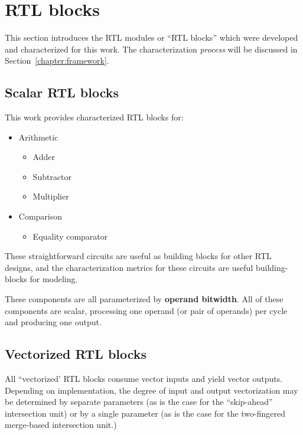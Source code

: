 \chapter{RTL blocks}
\label{chapter:rtl}

This section introduces the RTL modules or ``RTL blocks'' which were developed and characterized for this work. The characterization \textit{process} will be discussed in Section~\ref{chapter:framework}.

\section{Scalar RTL blocks}

This work provides characterized RTL blocks for:

\begin{itemize}
    \item Arithmetic

    \begin{itemize}
        \item Adder
        \item Subtractor
        \item Multiplier
    \end{itemize}
    
    \item Comparison

    \begin{itemize}
        \item Equality comparator
    \end{itemize}
\end{itemize}

These straightforward circuits are useful as building blocks for other RTL designs, and the characterization metrics for these circuits are useful building-blocks for modeling.

These components are all parameterized by \textbf{operand bitwidth}. All of these components are scalar, processing one operand (or pair of operands) per cycle and producing one output.

\section{Vectorized RTL blocks}

All ``vectorized' RTL blocks consume vector inputs and yield vector outputs. Depending on implementation, the degree of input and output vectorization may be determined by separate parameters (as is the case for the ``skip-ahead'' intersection unit) or by a single parameter (as is the case for the two-fingered merge-based intersection unit.)

